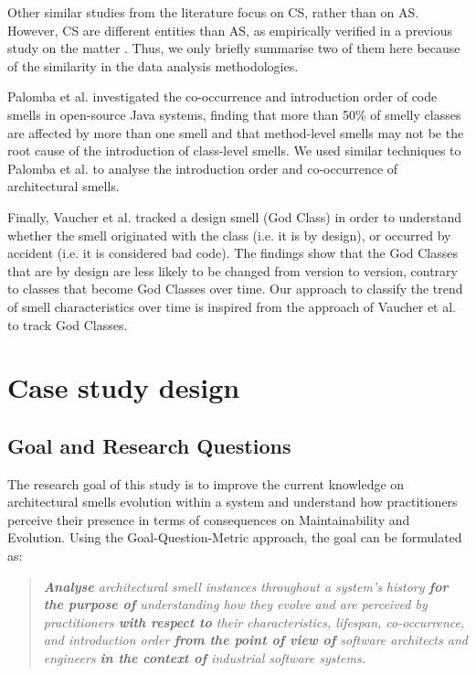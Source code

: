Other similar studies from the literature focus on CS, rather than on AS. However, CS are different entities than AS, as empirically verified in a previous study on the matter \cite{Arcelli2019}. Thus, we only briefly summarise two of them here because of the similarity in the data analysis methodologies.

Palomba et al. \cite{Palomba2018} investigated the co-occurrence and introduction order of code smells in open-source Java systems, finding that more than 50\% of smelly classes are affected by more than one smell and that method-level smells may not be the root cause of the introduction of class-level smells.
We used similar techniques to Palomba et al. to analyse the introduction order and co-occurrence of architectural smells.

Finally, Vaucher et al. \cite{Vaucher2009} tracked a design smell (God Class) in order to understand whether the smell originated with the class (i.e. it is by design), or occurred by accident (i.e. it is considered bad code).
The findings show that the God Classes that are by design are less likely to be changed from version to version, contrary to classes that become God Classes over time.
Our approach to classify the trend of smell characteristics over time is inspired from the approach of Vaucher et al. to track God Classes.


\section{Case study design}\label{c4:sec:case-study}

\subsection{Goal and Research Questions}
The research goal of this study is to improve the current knowledge on architectural smells evolution within a system and understand how practitioners perceive their presence in terms of consequences on Maintainability and Evolution.
Using the Goal-Question-Metric \cite{VanSolingen2002} approach, the goal can be formulated as: 
\begin{quote}
    \itshape
    \textbf{Analyse} architectural smell instances throughout a system's history \textbf{for the purpose of} understanding how they evolve and are perceived by practitioners \textbf{with respect to} their characteristics, lifespan, co-occurrence, and introduction order \textbf{from the point of view of} software architects and engineers \textbf{in the context of} industrial software systems.
\end{quote}

